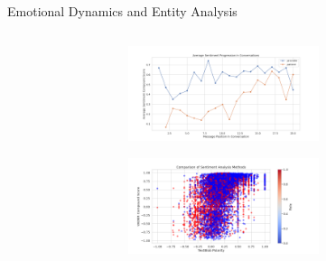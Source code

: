 \begin{frame}{Emotional Dynamics and Entity Analysis}
  \begin{columns}
    \begin{column}{0.5\textwidth}
      \begin{minipage}{\textwidth}
        \includegraphics[width=0.95\textwidth, height=2.8cm]{images/analysis/plots/sentiment_progression.png}
      \end{minipage}
      
      \begin{minipage}{\textwidth}
        \includegraphics[width=0.95\textwidth, height=2.8cm]{images/analysis/plots_advanced/sentiment_comparison.png}
      \end{minipage}
    \end{column}
    

\end{columns}
\end{frame}
